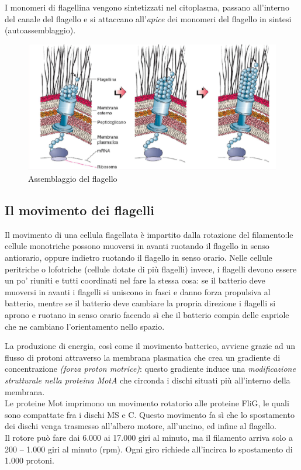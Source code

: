 \documentclass[11pt]{book}
\begin{document}
I monomeri di flagellina vengono sintetizzati nel citoplasma, passano all’interno del canale del flagello e si attaccano all’\emph{apice} dei monomeri del flagello in sintesi (autoassemblaggio).

\begin{figure}[htp]
\centering
\includegraphics[scale=0.5]{img/Assemblaggio flagello.png}
\caption{Assemblaggio del flagello}
\label{}
\end{figure}


\subsection{Il movimento dei flagelli}

Il movimento di una cellula flagellata è impartito dalla rotazione del filamento:le cellule monotriche possono muoversi in avanti ruotando il flagello in senso antiorario, oppure indietro ruotando il flagello in senso orario. Nelle cellule peritriche o lofotriche (cellule dotate di più flagelli) invece, i flagelli devono essere un po’ riuniti e tutti coordinati nel fare la stessa cosa: se il batterio deve muoversi in avanti i flagelli si uniscono in fasci e danno forza propulsiva al batterio, mentre se il batterio deve cambiare la propria direzione i flagelli si aprono e ruotano in senso orario facendo sì che il batterio compia delle capriole che ne cambiano l’orientamento nello spazio.

\vspace{1em}
La produzione di energia, così come il movimento batterico, avviene grazie ad un flusso di protoni attraverso la membrana plasmatica che crea un gradiente di concentrazione \emph{(forza proton motrice)}: questo gradiente induce una \emph{modificazione strutturale nella proteina MotA} che circonda i dischi situati più all’interno della membrana.\\
Le proteine Mot imprimono un movimento rotatorio alle proteine FliG, le quali sono compattate fra i dischi MS e C. Questo movimento fa sì che lo spostamento dei dischi venga trasmesso all’albero motore, all’uncino, ed infine al flagello.\\
Il rotore può fare dai 6.000 ai 17.000 giri al minuto, ma il filamento arriva solo a 200 – 1.000 giri al minuto (rpm). Ogni giro richiede all’incirca lo spostamento di 1.000 protoni.
\end{document}
